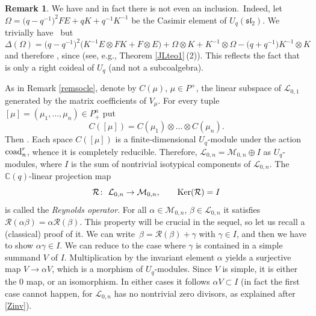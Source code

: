 \documentclass[pdftex]{sigma}
\numberwithin{equation}{section}
\theoremstyle{definition}
\newtheorem{Remark}[teo]{Remark}
\newcommand{\mc}{\mathbb{C}}
\newcommand{\Ll}{{\mathcal L}}
\newcommand{\Mm}{{\mathcal M}}
\newcommand{\Rr}{{\mathcal R}}
\newcommand{\ra}{\rightarrow}
\begin{document}
\begin{Remark}We have  and in fact there is not even an inclusion.~Indeed, let $\Omega=\big(q-q^{-1}\big)^2FE+qK+q^{-1}K^{-1}$ be the Casimir element of $U_q({\mathfrak{sl}_2})$. We trivially have~ but
\[\Delta(\Omega)=\big(q-q^{-1}\big)^2\big(K^{-1}E\otimes FK+F\otimes E\big)+
\Omega\otimes K+ K^{-1}\otimes \Omega-\big(q+q^{-1}\big)K^{-1}\otimes K\]
and therefore , since  (see, e.g., Theorem \ref{JLteo1}\,(2)). This reflects the fact that  is only a right coideal of $U_q$ (and not a subcoalgebra).
\end{Remark}
As in Remark \ref{remsocle}, denote by $C(\mu)$, $\mu\in P^+$, the linear subspace of $\Ll_{0,1}$ generated by the matrix coefficients of $V_\mu$. For every tuple $[\mu] = (\mu_1,\dots,\mu_n)\in P_+^n$ put
\begin{equation}\label{defCmu}
C([\mu]) =C(\mu_1)\otimes \dots \otimes C(\mu_n).
\end{equation}
Then . Each space $C({[\mu]})$ is a finite-dimensional $U_q$-module under the action ${\rm coad}^r_n$, whence it is completely reducible. Therefore, $
\Ll_{0,n} = \Mm_{0,n} \oplus I$ as $U_q$-modules, where $I$ is the sum of nontrivial isotypical components of $\Ll_{0,n}$. The $\mc(q)$-linear projection map
\begin{equation}\label{Reynoldsdef}
\Rr\colon\ {\mathcal L}_{0,n}\ra \Mm_{0,n}, \qquad {\rm Ker}(\Rr)=I
\end{equation}
is called the {\it Reynolds operator}. For all $\alpha\in \Mm_{0,n}$, $\beta \in \Ll_{0,n}$ it satisfies $
\Rr(\alpha \beta) = \alpha \Rr(\beta)$.
This property will be crucial in the sequel, so let us recall a (classical) proof of it. We can write~${\beta = \Rr(\beta) + \gamma}$ with $\gamma \in I$, and then we have to show $\alpha \gamma \in I$. We can reduce to the case where $\gamma$ is contained in a simple summand $V$ of $I$. Multiplication by the invariant element $\alpha$ yields a surjective map $V \ra \alpha V$, which is a morphism of $U_q$-modules. Since $V$ is simple, it is either the $0$ map, or an isomorphism. In either cases it follows $\alpha V \subset I$ (in fact the first case cannot happen, for $\Ll_{0,n}$ has no nontrivial zero divisors, as explained after \eqref{Zinv}).
\end{document}
